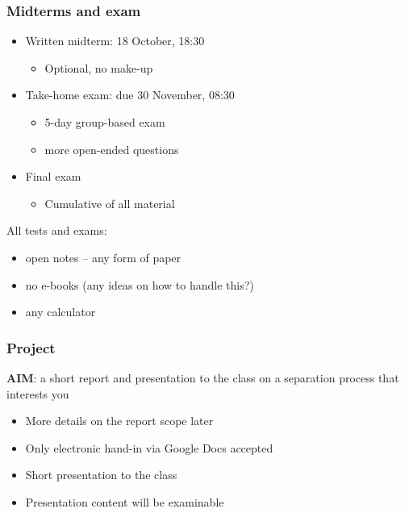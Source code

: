 \begin{frame}\frametitle{Midterms and exam}
	\begin{itemize}
		\item	Written midterm: 18 October, 18:30
		\begin{itemize}
			\item	Optional, no make-up
		\end{itemize}
		
		\item	Take-home exam: due 30 November, 08:30
		\begin{itemize}
			\item	5-day group-based exam
			\item	more open-ended questions
		\end{itemize}
		
		\item	Final exam
		\begin{itemize}
			\item	Cumulative of all material
		\end{itemize}		
	\end{itemize}

	\vspace{12pt}
	All tests and exams:
	\begin{itemize}
		\item	open notes -- any form of paper
		\item	no e-books (any ideas on how to handle this?)
		\item	any calculator
	\end{itemize}	
\end{frame}

\begin{frame}\frametitle{Project}
	\begin{exampleblock}{}
		\textbf{AIM}: a short report and presentation to the class on a separation process that interests you
	\end{exampleblock}
	\begin{itemize}
		\item	More details on the report scope later
		\item	Only electronic hand-in via Google Docs accepted
		\item	Short presentation to the class
		\item	Presentation content will be examinable
	\end{itemize}
\end{frame}

